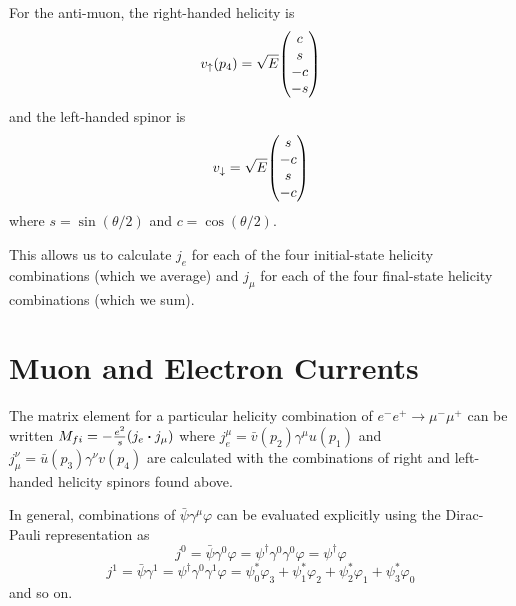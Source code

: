 \documentclass[a4paper,twoside,master.tex]{subfiles}
\begin{document}

For the anti-muon, the right-handed helicity is
\begin{equation}
    v_{\uparrow}(p_4) = \sqrt{E} \mqty(c\\s\\-c\\-s)
\end{equation}
and the left-handed spinor is
\begin{equation}
    v_{\downarrow} = \sqrt{E} \mqty(s\\-c\\s\\-c)
\end{equation}
where $ s = \sin(\theta / 2) $ and $ c = \cos(\theta / 2) $.

This allows us to calculate $ j_e $ for each of the four initial-state helicity combinations (which we average) and $ j_{\mu} $ for each of the four final-state helicity combinations (which we sum).

\section{Muon and Electron Currents}\label{sec:muon_and_electron_currents}

The matrix element for a particular helicity combination of $ e^- e^+ \to \mu^- \mu^+ $ can be written $ M_{fi} = - \frac{e^2}{s} (j_e \vdot j_{\mu}) $ where $ j_e^{\mu} = \bar{v}(p_2) \gamma^{\mu} u(p_1) $ and $ j_{\mu}^{\nu} = \bar{u}(p_3) \gamma^{\nu} v(p_4) $ are calculated with the combinations of right and left-handed helicity spinors found above.

In general, combinations of $ \bar{\psi} \gamma^{\mu} \varphi $ can be evaluated explicitly using the Dirac-Pauli representation as
\begin{equation}
    j^0 = \bar{\psi} \gamma^0 \varphi = \psi^\dagger \gamma^0 \gamma^0 \varphi = \psi^\dagger \varphi
\end{equation}
\begin{equation}
    j^1 = \bar{\psi} \gamma^1 = \psi^\dagger \gamma^0 \gamma^1 \varphi = \psi_0^* \varphi_3 + \psi_1^* \varphi_2 + \psi_2^* \varphi_1 + \psi_3^* \varphi_0
\end{equation}
and so on.
\end{document}
